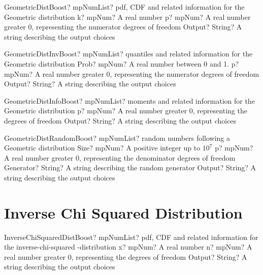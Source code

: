 \documentclass[12pt,a4paper,openany]{book}
\begin{document}
\begin{mpFunctionsExtract}
\mpFunctionThreeNotImplemented
{GeometricDistBoost? mpNumList? pdf, CDF and related information for the Geometric distribution}
{k? mpNum? A real number}
{p? mpNum? A real number greater 0, representing the numerator  degrees of freedom}
{Output? String? A string describing the output choices}
\end{mpFunctionsExtract}

\begin{mpFunctionsExtract}
\mpFunctionThreeNotImplemented
{GeometricDistInvBoost? mpNumList? quantiles and related information for the Geometric distribution}
{Prob? mpNum? A real number between 0 and 1.}
{p? mpNum? A real number greater 0, representing the numerator  degrees of freedom}
{Output? String? A string describing the output choices}
\end{mpFunctionsExtract}

\begin{mpFunctionsExtract}
\mpFunctionTwoNotImplemented
{GeometricDistInfoBoost? mpNumList? moments and related information for the Geometric distribution}
{p? mpNum? A real number greater 0, representing the degrees of freedom}
{Output? String? A string describing the output choices}
\end{mpFunctionsExtract}

\begin{mpFunctionsExtract}
\mpFunctionFourNotImplemented
{GeometricDistRandomBoost? mpNumList? random numbers following a Geometric distribution}
{Size? mpNum? A positive integer up to $10^7$}
{p? mpNum? A real number greater 0, representing the denominator degrees of freedom}
{Generator? String? A string describing the random generator}
{Output? String? A string describing the output choices}
\end{mpFunctionsExtract}

\section{Inverse Chi Squared Distribution}

\begin{mpFunctionsExtract}
\mpFunctionThreeNotImplemented
{InverseChiSquaredDistBoost? mpNumList? pdf, CDF and related information for the inverse-chi-squared -distribution}
{x? mpNum? A real number}
{n? mpNum? A real number greater 0, representing the degrees of freedom}
{Output? String? A string describing the output choices}
\end{mpFunctionsExtract}
\end{document}
